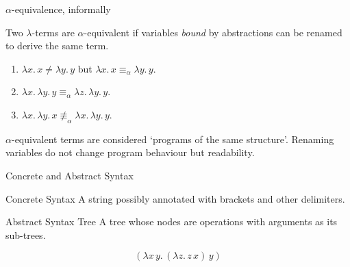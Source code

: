 \begin{frame}{$\alpha$-equivalence, informally}
  \begin{definition}
    Two $\lambda$-terms are \alert{$\alpha$-equivalent} if variables
    \emph{bound} by abstractions can be renamed to derive the same term. 
  \end{definition}
  \begin{example}
    \begin{enumerate}
      \item $\lambda x.\, x \neq \lambda y.\, y$  but $\lambda x.\, x
        \equiv_\alpha \lambda y.\, y$. 
      \item $\lambda x.\, \lambda y.\, y \equiv_\alpha 
        \lambda z.\, \lambda y.\, y$. 
      \item $\lambda x.\, \lambda y.\, x \mathrel{\not\equiv}_\alpha
        \lambda x.\, \lambda y.\, y$. 
    \end{enumerate}
  \end{example}
  $\alpha$-equivalent terms are considered `programs of the same structure'.
  Renaming variables do not change program behaviour but
  readability.
\end{frame}

\begin{frame}{Concrete and Abstract Syntax}
  \begin{block}{Concrete Syntax}
    A string possibly annotated with brackets and other delimiters.
  \end{block}
  
  \begin{block}{Abstract Syntax Tree}
    A tree whose nodes are operations
    with arguments as its sub-trees.
  \end{block}

  \[
    (\lambda x\, y.\, (\lambda z.\, z\, x)\, y)
  \]
\end{frame}

